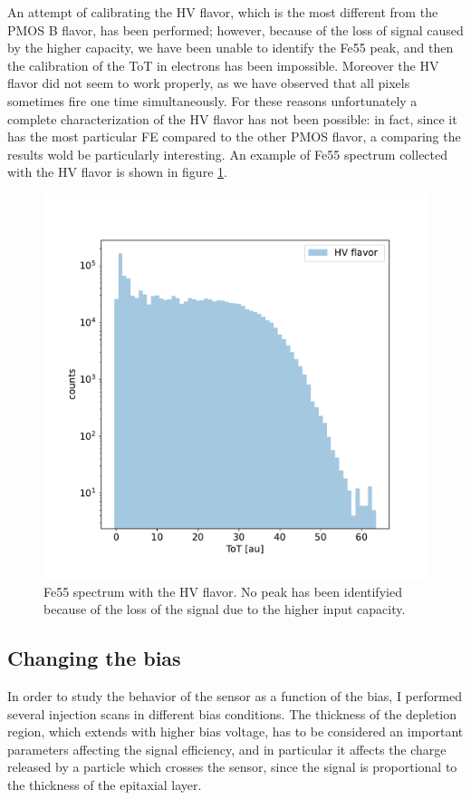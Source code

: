         An attempt of calibrating the HV flavor, which is the most different from the PMOS B flavor, has been performed; however, because of the loss of signal caused by the higher capacity, we have been unable to identify the Fe55 peak, and then the calibration of the ToT in electrons has been impossible.
        Moreover the HV flavor did not seem to work properly, as we have observed that all pixels sometimes fire one time simultaneously. For these reasons unfortunately a complete characterization of the HV flavor has not been possible: in fact, since it has the most particular FE compared to the other PMOS flavor, a comparing the results wold be particularly interesting.
        An example of Fe55 spectrum collected with the HV flavor is shown in figure \ref{fig:HV_fe55}. 
        \begin{figure}[h!]
            \centering
            \includegraphics[width=.55\linewidth]{figures/charaterization/Fe55_HV.pdf}
            \caption{Fe55 spectrum with the HV flavor. No peak has been identifyied because of the loss of the signal due to the higher input capacity.}
            \label{fig:HV_fe55}
        \end{figure}  

    \subsection{Changing the bias}\label{chap:characterization_section:bias}
        In order to study the behavior of the sensor as a function of the bias, I performed several injection scans in different bias conditions. 
        The thickness of the depletion region, which extends with higher bias voltage, has to be considered an important parameters affecting the signal efficiency, and in particular it affects the charge released by a particle which crosses the sensor, since the signal is proportional to the thickness of the epitaxial layer.
        
